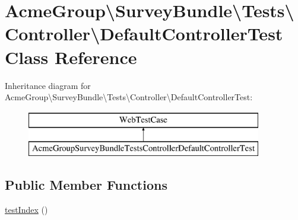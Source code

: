 \hypertarget{class_acme_group_1_1_survey_bundle_1_1_tests_1_1_controller_1_1_default_controller_test}{\section{Acme\+Group\textbackslash{}Survey\+Bundle\textbackslash{}Tests\textbackslash{}Controller\textbackslash{}Default\+Controller\+Test Class Reference}
\label{class_acme_group_1_1_survey_bundle_1_1_tests_1_1_controller_1_1_default_controller_test}
}
Inheritance diagram for Acme\+Group\textbackslash{}Survey\+Bundle\textbackslash{}Tests\textbackslash{}Controller\textbackslash{}Default\+Controller\+Test\+:\begin{figure}[H]
\begin{center}
\leavevmode
\includegraphics[height=2.000000cm]{class_acme_group_1_1_survey_bundle_1_1_tests_1_1_controller_1_1_default_controller_test}
\end{center}
\end{figure}
\subsection*{Public Member Functions}
\begin{DoxyCompactItemize}
\item 
\hyperlink{class_acme_group_1_1_survey_bundle_1_1_tests_1_1_controller_1_1_default_controller_test_a0b21695e43f33a6491f5510b32787402}{test\+Index} ()
\end{DoxyCompactItemize}


